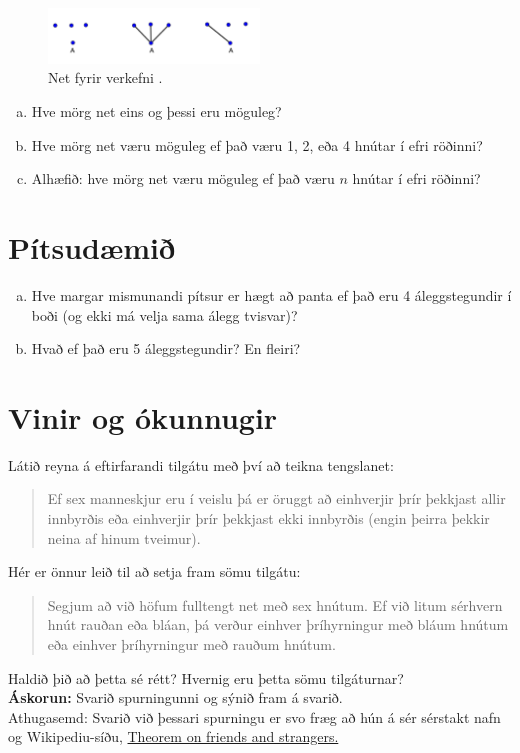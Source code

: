\documentclass[b5paper,12pt]{book}
\renewcommand*\thesection{\arabic{section}}
\begin{document}
\begin{figure}[h]
  \includegraphics[width=0.5\textwidth, center]{1-3net.png}
  \caption*{Net fyrir verkefni \thesection{}.}
\end{figure}
\begin{enumerate}[(a)]
    \item Hve mörg net eins og þessi eru möguleg?
    \item Hve mörg net væru möguleg ef það væru 1, 2, eða 4 hnútar í efri röðinni?
    \item Alhæfið: hve mörg net væru möguleg ef það væru $n$ hnútar í efri röðinni?
\end{enumerate}

\section{Pítsudæmið}
\begin{enumerate}[(a)]
\item Hve margar mismunandi pítsur er hægt að panta ef það eru 4 áleggstegundir í boði (og ekki má velja sama álegg tvisvar)?
\item Hvað ef það eru 5 áleggstegundir? En fleiri?
\end{enumerate}

\section{Vinir og ókunnugir} 
Látið reyna á eftirfarandi tilgátu með því að teikna tengslanet:
\begin{quote}
Ef sex manneskjur eru í veislu þá er öruggt að einhverjir þrír þekkjast allir innbyrðis eða einhverjir þrír þekkjast ekki innbyrðis (engin þeirra þekkir neina af hinum tveimur).
\end{quote}
Hér er önnur leið til að setja fram sömu tilgátu:
\begin{quote}
Segjum að við höfum fulltengt net með sex hnútum. Ef við litum sérhvern hnút rauðan eða bláan, þá verður einhver þríhyrningur með bláum hnútum eða einhver þríhyrningur með rauðum hnútum.
\end{quote}
Haldið þið að þetta sé rétt? Hvernig eru þetta sömu tilgáturnar?\\
\textbf{Áskorun:} Svarið spurningunni og sýnið fram á svarið.\\
Athugasemd: Svarið við þessari spurningu er svo fræg að hún á sér sérstakt nafn og Wikipediu-síðu, \href {https://en.wikipedia.org/wiki/Theorem_on_friends_and_strangers} {Theorem on friends and strangers.} 
\end{document}

